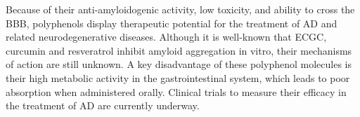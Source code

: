 


Because of their anti-amyloidogenic activity, low toxicity, and ability to cross the BBB, polyphenols display therapeutic potential for the treatment of AD and related neurodegenerative diseases.  Although it is well-known that ECGC, curcumin and resveratrol inhibit amyloid aggregation in vitro, their mechanisms of action are still unknown. A key disadvantage of these polyphenol molecules is their high metabolic activity in the gastrointestinal system, which leads to poor absorption when administered orally.\cite{Baur:2006bx,Smith:2011iq,Hamaguchi:2010wu} Clinical trials to measure their efficacy in the treatment of AD are currently underway.



